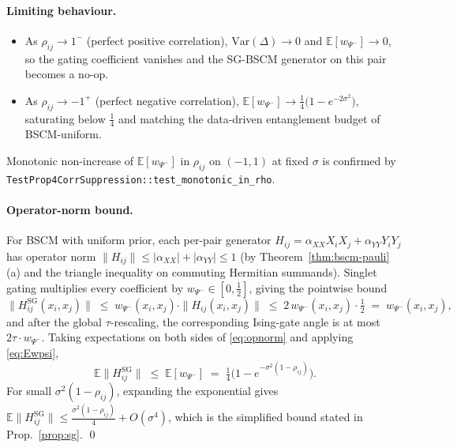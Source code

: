 \documentclass[pdflatex,sn-mathphys-num]{sn-jnl}
\theoremstyle{thmstyleone}
\theoremstyle{thmstyletwo}
\theoremstyle{thmstylethree}
\begin{document}
\paragraph{Limiting behaviour.}
\begin{itemize}
\item As $\rho_{ij}\to 1^-$ (perfect positive correlation),
$\mathrm{Var}(\Delta)\to 0$ and $\mathbb{E}[w_{\Psi^-}]\to 0$, so the
gating coefficient vanishes and the SG-BSCM generator on this pair
becomes a no-op.
\item As $\rho_{ij}\to -1^+$ (perfect negative correlation),
$\mathbb{E}[w_{\Psi^-}]\to \tfrac14\bigl(1 - e^{-2\sigma^2}\bigr)$,
saturating below $\tfrac14$ and matching the data-driven entanglement
budget of BSCM-uniform.
\end{itemize}
Monotonic non-increase of $\mathbb{E}[w_{\Psi^-}]$ in $\rho_{ij}$ on
$(-1,1)$ at fixed $\sigma$ is confirmed by
\texttt{TestProp4CorrSuppression::test\_monotonic\_in\_rho}.

\paragraph{Operator-norm bound.}
For BSCM with uniform prior, each per-pair generator
$H_{ij} = \alpha_{XX} X_iX_j + \alpha_{YY} Y_iY_j$ has operator norm
$\|H_{ij}\| \le |\alpha_{XX}| + |\alpha_{YY}| \le 1$
(by Theorem~\ref{thm:bscm-pauli}\,(a) and the triangle inequality on
commuting Hermitian summands). Singlet gating multiplies every
coefficient by $w_{\Psi^-}\in[0,\tfrac12]$, giving the pointwise
bound
\begin{equation}\label{eq:opnorm}
\|H^{\mathrm{SG}}_{ij}(x_i,x_j)\|
\;\le\; w_{\Psi^-}(x_i,x_j) \cdot \|H_{ij}(x_i,x_j)\|
\;\le\; 2\,w_{\Psi^-}(x_i,x_j) \cdot \tfrac12
\;=\; w_{\Psi^-}(x_i,x_j),
\end{equation}
and after the global $\tau$-rescaling, the corresponding Ising-gate
angle is at most $2\tau\cdot w_{\Psi^-}$. Taking expectations on
both sides of \eqref{eq:opnorm} and applying \eqref{eq:Ewpsi},
\begin{equation}\label{eq:expnorm}
\mathbb{E}\|H^{\mathrm{SG}}_{ij}\|
\;\le\; \mathbb{E}[w_{\Psi^-}]
\;=\; \tfrac14\bigl(1 - e^{-\sigma^2(1-\rho_{ij})}\bigr).
\end{equation}
For small $\sigma^2(1-\rho_{ij})$, expanding the exponential gives
$\mathbb{E}\|H^{\mathrm{SG}}_{ij}\| \le \tfrac{\sigma^2(1-\rho_{ij})}{4} + O(\sigma^4)$,
which is the simplified bound stated in Prop.~\ref{prop:sg}. \qed
\end{document}

